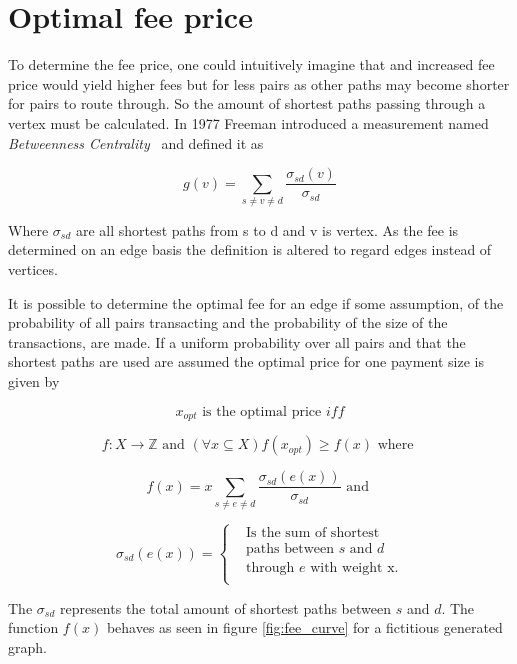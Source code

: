 \section{Optimal fee price}

To determine the fee price, one could intuitively imagine that and increased fee price would yield higher fees but for less pairs as other paths may become shorter for pairs to route through. So the amount of shortest paths passing through a vertex must be calculated. In 1977 Freeman introduced a measurement named \textit{Betweenness Centrality}~\cite{freeman:betweenness:centrality} and defined it as

\[ g(v) = \sum_{s \neq v \neq d}\frac{\sigma_{sd}(v)}{\sigma_{sd}} \]

Where $\sigma_{sd}$ are all shortest paths from s to d and v is vertex. As the fee is determined on an edge basis the definition is altered to regard edges instead of vertices. 

It is possible to determine the optimal fee for an edge if some assumption, of the probability of all pairs transacting and the probability of the size of the transactions, are made. If a uniform probability over all pairs and that the shortest paths are used are assumed the optimal price for one payment size is given by

\[ x_{opt} \textrm{ is the optimal price } iff \]

\[ f: X \to \mathbb{Z} \textrm{ and } (\forall x \subseteq X)f(x_{opt}) \geqslant f(x) \textrm{ where }\]

\[ f(x) = x\sum_{s \neq e \neq d}\frac{\sigma_{sd}(e(x))}{\sigma_{sd}} \textrm{ and } \]


\[ \sigma_{sd}(e(x)) =  \begin{cases}
 & \text{Is the sum of shortest } \\
 & \text{paths between $s$ and $d$} \\
& \text{through $e$ with weight x.} \\

\end{cases} \]


The $\sigma_{sd}$ represents the total amount of shortest paths between $s$ and $d$.
The function $f(x)$ behaves as seen in figure \ref{fig:fee_curve} for a fictitious generated graph. 

